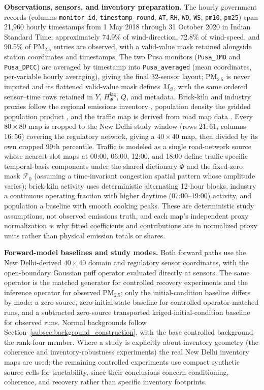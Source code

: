 \noindent\textbf{Observations, sensors, and inventory preparation.}
The hourly government records \citep{cpcb,cpcb_portal} (columns
\texttt{monitor\_id}, \texttt{timestamp\_round}, \texttt{AT}, \texttt{RH},
\texttt{WD}, \texttt{WS}, \texttt{pm10}, \texttt{pm25}) span 21,960 hourly
timestamps from 1 May 2018 through 31 October 2020 in Indian Standard Time;
approximately 74.9\% of wind-direction, 72.8\% of wind-speed, and 90.5\% of
PM\(_{2.5}\) entries are observed, with a valid-value mask retained alongside
station coordinates and timestamps.  The two Pusa monitors (\texttt{Pusa\_IMD} and
\texttt{Pusa\_DPCC}) are averaged by timestamp into \texttt{Pusa\_averaged} (mean
coordinates, per-variable hourly averaging), giving the final 32-sensor layout;
PM\(_{2.5}\) is never imputed and its flattened valid-value mask defines
\(M_{\mathcal O}\), with the same ordered sensor--time rows retained in \(Y\),
\(H_\Phi^{\mathrm{lag}}\), \(Q\), and metadata.  Brick-kiln and industry proxies
follow the regional emissions inventory \citep{GUTTIKUNDA2013101}, population
density the gridded population product \citep{ColumbiaUniversity2018}, and the
traffic map is derived from road map data \citep{google_maps}.  Every
\(80\times80\) map is cropped to the New Delhi study window (rows \(21{:}61\),
columns \(16{:}56\)) covering the regulatory network, giving a \(40\times40\) map,
then divided by its own cropped 99th percentile.  Traffic is modeled as a single
road-network source whose nearest-slot maps at 00:00, 06:00, 12:00, and 18:00
define traffic-specific temporal-basis components under the shared dictionary
\(\Phi\) and the fixed-zero mask \(\mathcal F_0\) (assuming a time-invariant
congestion spatial pattern whose amplitude varies); brick-kiln activity uses
deterministic alternating 12-hour blocks, industry a continuous operating fraction
with higher daytime (07:00--19:00) activity, and population a baseline with smooth
cooking peaks.  These are deterministic study assumptions, not observed emissions
truth, and each map's independent proxy normalization is why fitted coefficients
and contributions are in normalized proxy units rather than physical emission
totals or shares.

\noindent\textbf{Forward-model baselines and study modes.}
Both forward paths use the New Delhi-derived \(40\times40\) domain and regulatory
sensor coordinates, with the open-boundary Gaussian puff operator evaluated
directly at sensors.  The same operator is the matched generator for controlled
recovery experiments and the inference operator for observed PM\(_{2.5}\); only the
initial-condition baseline differs by mode: a zero-source, zero-initial-state
baseline for controlled operator-matched runs, and a subtracted zero-source
transported kriged-initial-condition baseline for observed runs.  Normal
backgrounds follow Section~\ref{subsec:background_construction}, with the base
controlled background the rank-four member.  Where a study is explicitly about
inventory geometry (the coherence and inventory-robustness experiments) the real
New Delhi inventory maps are used; the remaining controlled experiments use compact
synthetic source cells for tractability, since their conclusions concern
conditioning, coherence, and recovery rather than specific inventory footprints.

